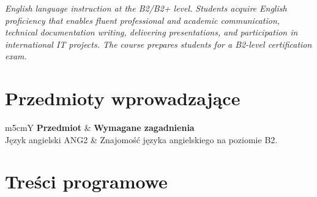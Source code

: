 \documentclass[12pt, a4paper]{article}
\newcommand{\thdrule}{\noalign{\global\setlength{\extrarowheight}{0pt}}}
\newcommand{\thdend}{\noalign{\global\setlength{\extrarowheight}{3pt}}}
\begin{document}
\textit{English language instruction at the B2/B2+ level. Students acquire English proficiency that enables fluent professional and academic communication, technical documentation writing, delivering presentations, and participation in international IT projects. The course prepares students for a B2-level certification exam.}


\section{Przedmioty wprowadzające}

{\scriptsize
\begin{tabularx}{\textwidth}{m{5cm}Y}
\thdrule\toprule
{} {\color{white}\textbf{Przedmiot}} & {\color{white}\textbf{Wymagane zagadnienia}} \\
\midrule\thdend
   Język angielski ANG2 & Znajomość języka angielskiego na poziomie B2. \\
\bottomrule
\end{tabularx}}

\section{Treści programowe}
\end{document}
